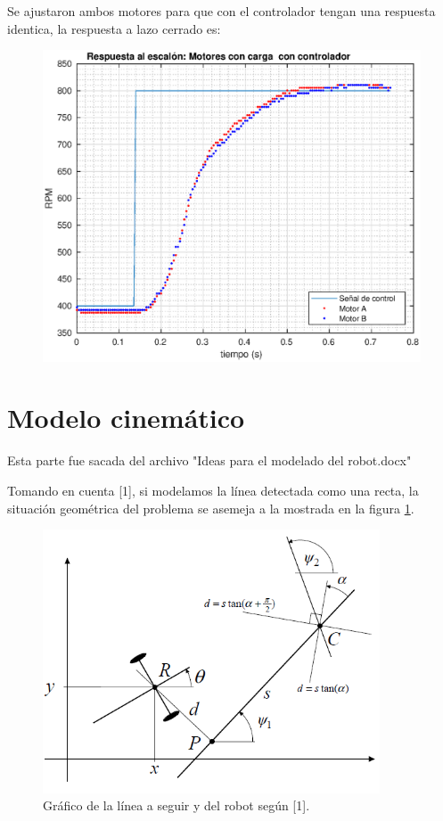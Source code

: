 \documentclass[10pt,conference,a4paper,onecolumn]{article}%
\begin{document}
Se ajustaron ambos motores para que con el controlador tengan una respuesta identica, la respuesta a lazo cerrado es:
\begin{figure}[h]
\centering
\includegraphics[width=15cm]{./imagenes/resp_escalon_motores_controlados_2}
\end{figure}


\section{Modelo cinemático}

Esta parte fue sacada del archivo "Ideas para el modelado del robot.docx"

Tomando en cuenta [1], si modelamos la línea detectada como una recta, la situación geométrica del problema se asemeja a la mostrada en la figura \ref{fig:sistema1}.

\begin{figure}[h]
\centering
\includegraphics[width=10cm]{./imagenes/sistema1.png}
\caption{Gráfico de la línea a seguir y del robot según [1].}
\label{fig:sistema1}
\end{figure}
\end{document}
